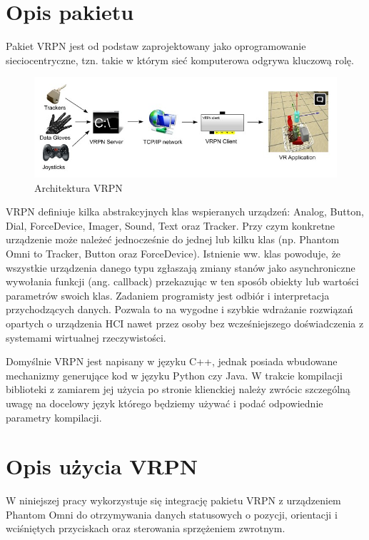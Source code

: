 \documentclass[licencjacka]{pracamgr}
\begin{document}
\section{Opis pakietu}
Pakiet VRPN jest od podstaw zaprojektowany jako oprogramowanie sieciocentryczne, tzn. takie w którym sieć komputerowa odgrywa kluczową rolę.

\begin{figure}[H]
\centering
\includegraphics[scale=0.6,center]{vrpn}
\caption{Architektura VRPN}
\end{figure}

VRPN definiuje kilka abstrakcyjnych klas wspieranych urządzeń: Analog, Button, Dial, ForceDevice, Imager, Sound, Text oraz Tracker. Przy czym konkretne urządzenie może należeć jednocześnie do jednej lub kilku klas (np. Phantom Omni to Tracker, Button oraz ForceDevice). Istnienie ww. klas powoduje, że wszystkie urządzenia danego typu zgłaszają zmiany stanów jako asynchroniczne wywołania funkcji (ang. callback) przekazując w ten sposób obiekty lub wartości parametrów swoich klas. Zadaniem programisty jest odbiór i interpretacja przychodzących danych. Pozwala to na wygodne i szybkie wdrażanie rozwiązań opartych o urządzenia HCI nawet przez osoby bez wcześniejszego doświadczenia z systemami wirtualnej rzeczywistości.

Domyślnie VRPN jest napisany w języku C++, jednak posiada wbudowane mechanizmy generujące kod w języku Python czy Java. W trakcie kompilacji biblioteki z zamiarem jej użycia po stronie klienckiej należy zwrócic szczególną uwagę na docelowy język którego będziemy używać i podać odpowiednie parametry kompilacji. 

\section{Opis użycia VRPN}
W niniejszej pracy wykorzystuje się integrację pakietu VRPN z urządzeniem Phantom Omni do otrzymywania danych statusowych o pozycji, orientacji i wciśniętych przyciskach oraz sterowania sprzężeniem zwrotnym.
\end{document}
